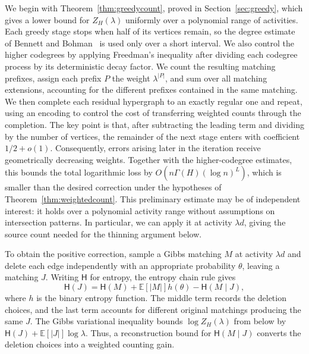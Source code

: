 \documentclass[11pt,reqno]{amsart}
\numberwithin{equation}{section}
\theoremstyle{plain}
\theoremstyle{definition}
\newcommand{\E}{\mathbb E}
\newcommand{\HH}{\mathsf H}
\begin{document}
We begin with Theorem~\ref{thm:greedycount}, proved in Section~\ref{sec:greedy}, which gives a lower bound for $Z_H(\lambda)$ uniformly over a polynomial range of activities.
Each greedy stage stops when half of its vertices remain, so the degree estimate of Bennett and Bohman~\cite{BB} is used only over a short interval.
We also control the higher codegrees by applying Freedman's inequality after dividing each codegree process by its deterministic decay factor.
We count the resulting matching prefixes, assign each prefix $P$ the weight $\lambda^{|P|}$, and sum over all matching extensions, accounting for the different prefixes contained in the same matching.
We then complete each residual hypergraph to an exactly regular one and repeat, using an encoding to control the cost of transferring weighted counts through the completion.
The key point is that, after subtracting the leading term and dividing by the number of vertices, the remainder of the next stage enters with coefficient $1/2+o(1)$.
Consequently, errors arising later in the iteration receive geometrically decreasing weights.
Together with the higher-codegree estimates, this bounds the total logarithmic loss by $O(n\Gamma(H)(\log n)^L)$, which is smaller than the desired correction under the hypotheses of Theorem~\ref{thm:weightedcount}.
This preliminary estimate may be of independent interest: it holds over a polynomial activity range without assumptions on intersection patterns.
In particular, we can apply it at activity $\lambda d$, giving the source count needed for the thinning argument below.

To obtain the positive correction, sample a Gibbs matching $M$ at activity $\lambda d$ and delete each edge independently with an appropriate probability $\theta$, leaving a matching $J$.
Writing $\HH$ for entropy, the entropy chain rule gives
\[
    \HH(J)=\HH(M)+\E[|M|]h(\theta)-\HH(M\mid J),
\]
where $h$ is the binary entropy function.
The middle term records the deletion choices, and the last term accounts for different original matchings producing the same $J$.
The Gibbs variational inequality bounds $\log Z_H(\lambda)$ from below by $\HH(J)+\E[|J|]\log\lambda$.
Thus, a reconstruction bound for $\HH(M\mid J)$ converts the deletion choices into a weighted counting gain.
\end{document}
